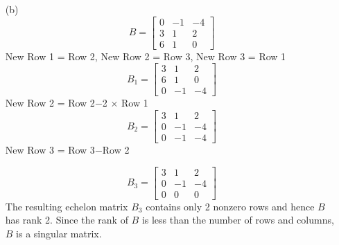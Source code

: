 \documentclass{./../../Latex/homework}
\begin{document}
\begin{enumerate}
\begin{enumerate}
\item[(b)]  \[
B=\left[\begin{array}{rrr}
0 & -1 & -4 \\
3 & 1 & 2 \\
6 & 1 & 0
\end{array}\right] 
\]
New Row 1 = Row 2, New Row 2 = Row 3, New Row 3 = Row 1
\[ 
B_{1}=\left[\begin{array}{rrr}
3 & 1 & 2 \\
6 & 1 & 0 \\
0 & -1 & -4
\end{array}\right] 
\]
New Row 2 = Row 2$-$2 $\times$ Row 1
$$
B_{2}=\left[\begin{array}{rrr}
3 & 1 & 2 \\
0 & -1 & -4 \\
0 & -1 & -4
\end{array}\right]
$$
New Row 3 = Row 3$-$Row 2

$$
B_{3}=\left[\begin{array}{rrr}
3 & 1 & 2 \\
0 & -1 & -4 \\
0 & 0 & 0
\end{array}\right]
$$
The resulting echelon matrix $B_3$ contains only 2 nonzero rows and hence $B$ has rank 2. Since the rank of $B$ is less than the number of rows and columns, $B$ is a singular matrix.  \\~\\


\end{enumerate}
\end{enumerate}
\end{document}

